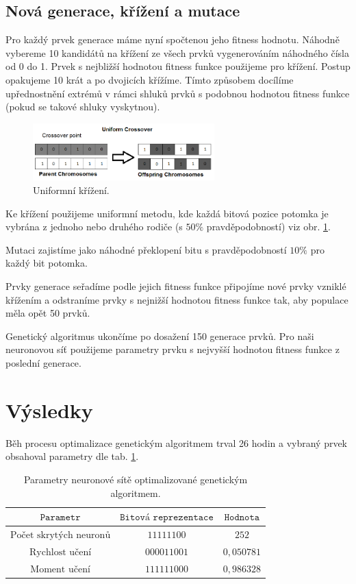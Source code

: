 \documentclass[12pt]{article}
\begin{document}
\subsection{Nová generace, křížení a mutace}
Pro každý prvek generace máme nyní spočtenou jeho fitness hodnotu. Náhodně vybereme 10 kandidátů na křížení ze všech prvků vygenerováním náhodného čísla od 0 do 1. Prvek s nejbližší hodnotou fitness funkce použijeme pro křížení. Postup opakujeme 10 krát a po dvojicích křížíme. Tímto způsobem docílíme upřednostnění extrémů v rámci shluků prvků s podobnou hodnotou fitness funkce (pokud se takové shluky vyskytnou).

\begin{figure}
\includegraphics[width=7cm]{Crossover.png}
\caption{Uniformní křížení.}
\label{Crossover}
\end{figure}

Ke křížení použijeme uniformní metodu, kde každá bitová pozice potomka je vybrána z jednoho nebo druhého rodiče (s $50\%$ pravděpodobností) viz obr. \ref{Crossover}. 

Mutaci zajistíme jako náhodné překlopení bitu s pravděpodobností $10\%$ pro každý bit potomka.

Prvky generace seřadíme podle jejich fitness funkce připojíme nové prvky vzniklé křížením a odstraníme prvky s nejnižší hodnotou fitness funkce tak, aby populace měla opět 50 prvků.

Genetický algoritmus ukončíme po dosažení 150 generace prvků. Pro naši neuronovou síť použijeme parametry prvku s nejvyšší hodnotou fitness funkce z poslední generace.

\section{Výsledky}
Běh procesu optimalizace genetickým algoritmem trval 26 hodin a vybraný prvek obsahoval parametry dle tab. \ref{GABPNN_attributes}.

\begin{table}[h]
\centering
\begin{tabular}{ccc}
$\texttt{Parametr}$ & $\texttt{Bitová reprezentace}$ & $\texttt{Hodnota}$\\\hline
$\text{Počet skrytých neuronů}$ 	& $11111100$	& $252$		\\
$\text{Rychlost učení}$ 			& $000011001$	& $0,050781$		\\
$\text{Moment učení}$ 				& $111111000$	& $0,986328$		\\
\end{tabular}
\caption{Parametry neuronové sítě optimalizované genetickým algoritmem.\label{GABPNN_attributes}}
\end{table}
\vspace{\baselineskip}
\end{document}
